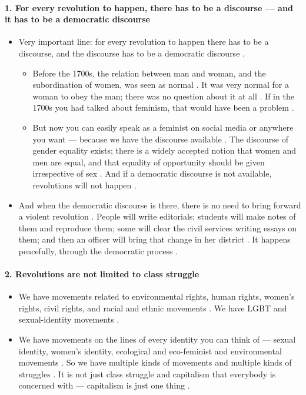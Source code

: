 \paragraph{1. For every revolution to happen, there has to be a discourse --- and it has to be a democratic discourse}
\begin{itemize}
    \item Very important line: for every revolution to happen there has to be a discourse, and the discourse has to be a democratic discourse .
    \begin{itemize}
        \item Before the 1700s, the relation between man and woman, and the subordination of women, was seen as normal . It was very normal for a woman to obey the man; there was no question about it at all . If in the 1700s you had talked about feminism, that would have been a problem .
        \item But now you can easily speak as a feminist on social media or anywhere you want --- because we have the discourse available . The discourse of gender equality exists; there is a widely accepted notion that women and men are equal, and that equality of opportunity should be given irrespective of sex . And if a democratic discourse is not available, revolutions will not happen .
    \end{itemize}
    \item And when the democratic discourse is there, there is no need to bring forward a violent revolution . People will write editorials; students will make notes of them and reproduce them; some will clear the civil services writing essays on them; and then an officer will bring that change in her district . It happens peacefully, through the democratic process .
\end{itemize}

\paragraph{2. Revolutions are not limited to class struggle}
\begin{itemize}
    \item We have movements related to environmental rights, human rights, women's rights, civil rights, and racial and ethnic movements . We have LGBT and sexual-identity movements .
    \item We have movements on the lines of every identity you can think of --- sexual identity, women's identity, ecological and eco-feminist and environmental movements . So we have multiple kinds of movements and multiple kinds of struggles . It is not just class struggle and capitalism that everybody is concerned with --- capitalism is just one thing .
\end{itemize}

